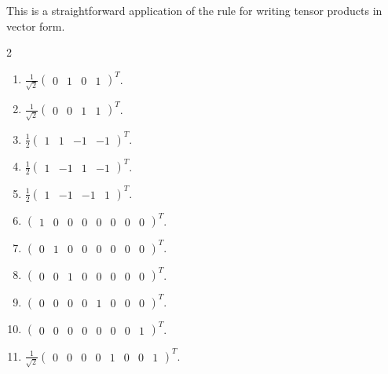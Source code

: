 \begin{solution}
This is a straightforward application of the rule for writing tensor products in vector form.
\begin{multicols}{2}
    \begin{enumerate}[label=(\alph*)]
    \item $\frac{1}{\sqrt{2}} \begin{pmatrix} 0 & 1 & 0 & 1 \end{pmatrix}^T$.
    \item $\frac{1}{\sqrt{2}} \begin{pmatrix} 0 & 0 & 1 & 1 \end{pmatrix}^T$.
    \item $\frac{1}{2} \begin{pmatrix} 1 & 1 & -1 & -1 \end{pmatrix}^T$.
    \item $\frac{1}{2} \begin{pmatrix} 1 & -1 & 1 & -1 \end{pmatrix}^T$.
    \item $\frac{1}{2} \begin{pmatrix} 1 & -1 & -1 & 1 \end{pmatrix}^T$.
    \item $\begin{pmatrix} 1 & 0 & 0 & 0 & 0 & 0 & 0 & 0 \end{pmatrix}^T$.
    \item $\begin{pmatrix} 0 & 1 & 0 & 0 & 0 & 0 & 0 & 0 \end{pmatrix}^T$.
    \item $\begin{pmatrix} 0 & 0 & 1 & 0 & 0 & 0 & 0 & 0 \end{pmatrix}^T$.
    \item $\begin{pmatrix} 0 & 0 & 0 & 0 & 1 & 0 & 0 & 0 \end{pmatrix}^T$.
    \item $\begin{pmatrix} 0 & 0 & 0 & 0 & 0 & 0 & 0 & 1 \end{pmatrix}^T$.
    \item $\frac{1}{\sqrt{2}} \begin{pmatrix} 0 & 0 & 0 & 0 & 1 & 0 & 0 & 1 \end{pmatrix}^T$.
    \end{enumerate}
\end{multicols}
\end{solution}

